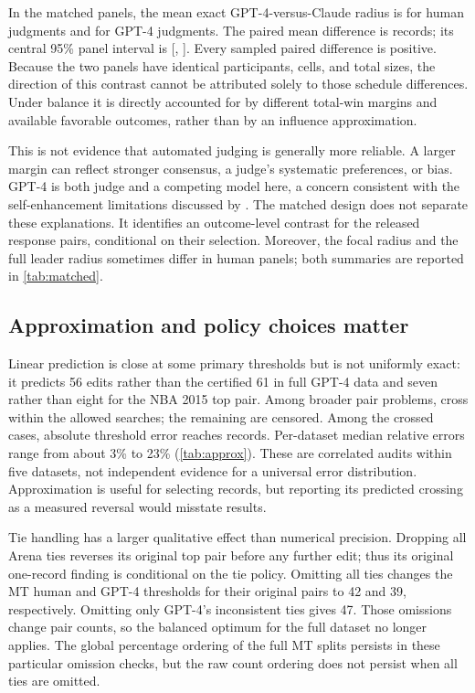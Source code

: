 \documentclass{article}
\begin{document}
In the matched panels, the mean exact GPT-4-versus-Claude radius is \HumanMatchMean{} for human judgments and \GPTMatchMean{} for GPT-4 judgments. The paired mean difference is \MatchDiffMean{} records; its central 95\% panel interval is [\MatchDiffLow{}, \MatchDiffHigh{}]. Every sampled paired difference is positive. Because the two panels have identical participants, cells, and total sizes, the direction of this contrast cannot be attributed solely to those schedule differences. Under balance it is directly accounted for by different total-win margins and available favorable outcomes, rather than by an influence approximation.

This is not evidence that automated judging is generally more reliable. A larger margin can reflect stronger consensus, a judge's systematic preferences, or bias. GPT-4 is both judge and a competing model here, a concern consistent with the self-enhancement limitations discussed by \citet{zheng2023}. The matched design does not separate these explanations. It identifies an outcome-level contrast for the released response pairs, conditional on their selection. Moreover, the focal radius and the full leader radius sometimes differ in human panels; both summaries are reported in \cref{tab:matched}.

\subsection{Approximation and policy choices matter}
Linear prediction is close at some primary thresholds but is not uniformly exact: it predicts 56 edits rather than the certified 61 in full GPT-4 data and seven rather than eight for the NBA 2015 top pair. Among \TestedPairs{} broader pair problems, \CrossedPairs{} cross within the allowed searches; the remaining \CensoredPairs{} are censored. Among the crossed cases, absolute threshold error reaches \MaxBudgetError{} records. Per-dataset median relative errors range from about 3\% to 23\% (\cref{tab:approx}). These are correlated audits within five datasets, not independent evidence for a universal error distribution. Approximation is useful for selecting records, but reporting its predicted crossing as a measured reversal would misstate results.

Tie handling has a larger qualitative effect than numerical precision. Dropping all Arena ties reverses its original top pair before any further edit; thus its original one-record finding is conditional on the tie policy. Omitting all ties changes the MT human and GPT-4 thresholds for their original pairs to 42 and 39, respectively. Omitting only GPT-4's inconsistent ties gives 47. Those omissions change pair counts, so the balanced optimum for the full dataset no longer applies. The global percentage ordering of the full MT splits persists in these particular omission checks, but the raw count ordering does not persist when all ties are omitted.
\end{document}
